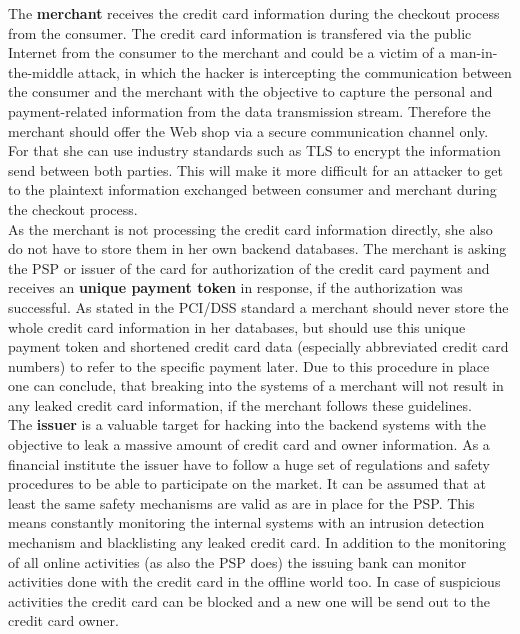 The \textbf{merchant} receives the credit card information during the checkout process from the consumer. The credit card information is transfered via the public Internet from the consumer to the merchant and could be a victim of a man-in-the-middle attack, in which the hacker is intercepting the communication between the consumer and the merchant with the objective to capture the personal and payment-related information from the data transmission stream. Therefore the merchant should offer the Web shop via a secure communication channel only. For that she can use industry standards such as TLS to encrypt the information send between both parties. This will make it more difficult for an attacker to get to the plaintext information exchanged between consumer and merchant during the checkout process. \\

As the merchant is not processing the credit card information directly, she also do not have to store them in her own backend databases. The merchant is asking the \gls{PSP} or issuer of the card for authorization of the credit card payment and receives an \textbf{unique payment token} in response, if the authorization was successful. As stated in the PCI/DSS standard \citep{virtue2009payment} a merchant should never store the whole credit card information in her databases, but should use this unique payment token and shortened credit card data (especially abbreviated credit card numbers) to refer to the specific payment later. Due to this procedure in place one can conclude, that breaking into the systems of a merchant will not result in any leaked credit card information, if the merchant follows these guidelines. \\

The \textbf{issuer} is a valuable target for hacking into the backend systems with the objective to leak a massive amount of credit card and owner information. As a financial institute the issuer have to follow a huge set of regulations and safety procedures to be able to participate on the market. It can be assumed that at least the same safety mechanisms are valid as are in place for the \gls{PSP}. This means constantly monitoring the internal systems with an intrusion detection mechanism and blacklisting any leaked credit card. In addition to the monitoring of all online activities (as also the \gls{PSP} does) the issuing bank can monitor activities done with the credit card in the offline world too. In case of suspicious activities the credit card can be blocked and a new one will be send out to the credit card owner. \\

